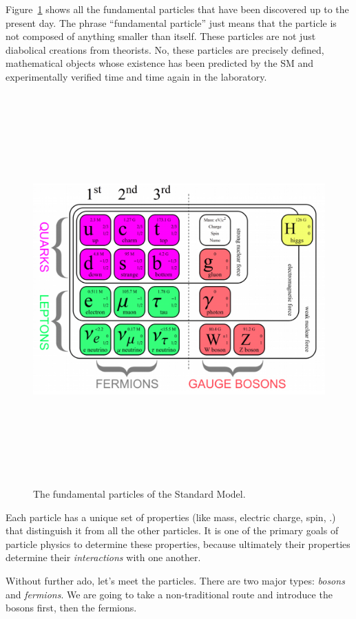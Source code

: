 Figure~\ref{fig:particulartable} shows all the fundamental particles that have been discovered up to the present day.
The phrase ``fundamental particle'' just means that the particle is not composed of anything smaller than itself. 
These particles are not just diabolical creations from theorists. 
No, these particles are precisely defined, mathematical objects whose existence has been predicted by the SM and experimentally verified time and time again in the laboratory.
\begin{figure}[pbth]
\centering
\includegraphics[width=15cm,height=15cm,keepaspectratio]{figures/sm/particular_table_updated.png}
    \caption{The fundamental particles of the Standard Model.} 
    \label{fig:particulartable}
\end{figure}

Each particle has a unique set of properties (like mass, electric charge, spin, \etc.) that distinguish it from all the other particles. 
It is one of the primary goals of particle physics to determine these properties, because ultimately their properties determine their \emph{interactions} with one another. 

Without further ado, let's meet the particles.
There are two major types: \emph{bosons} and \emph{fermions}.
We are going to take a non-traditional route and introduce the bosons first, then the fermions.

